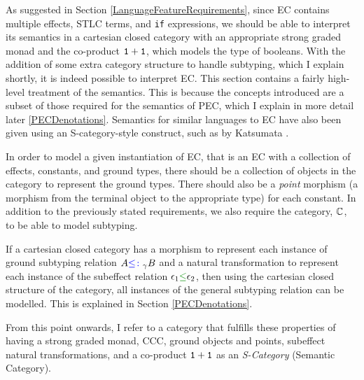 \documentclass{Report}
\begin{document}
As suggested in Section \ref{LanguageFeatureRequirements}, since EC contains multiple effects, STLC terms, and \texttt{if} expressions, we should be able to interpret its semantics in a cartesian closed category with an appropriate strong graded monad and the co-product $\texttt{1} + \texttt{1}$, which models the type of booleans. With the addition of some extra category structure to handle subtyping, which I explain shortly, it is indeed possible to interpret EC. This section contains a fairly high-level treatment of the semantics. This is because the concepts introduced are a subset of those required for the semantics of PEC, which I explain in more detail later \ref{PECDenotations}. Semantics for similar languages to EC have also been given using an S-category-style construct, such as by Katsumata \cite{Katsumata:2014}. 

In order to model a given instantiation of EC, that is an EC with a collection of effects, constants, and ground types, there should be a collection of objects in the category to represent the ground types. There should also be a \textit{point} morphism (a morphism from the terminal object to the appropriate type) for each constant. In addition to the previously stated requirements, we also require the category, $\mathbb{C}$, to be able to model subtyping. 

If a cartesian closed category has a morphism to represent each instance of  ground subtyping relation $A{\color{blue} \leq\colon}_\gamma B$ and a natural transformation to represent each instance of the subeffect relation $\e_1\subeffect \e_2$, then using the cartesian closed structure of the category, all instances of the general subtyping relation can be modelled. This is explained in Section \ref{PECDenotations}.

From this point onwards, I refer to a category that fulfills these properties of having a strong graded monad, CCC, ground objects and points, subeffect natural transformations, and a co-product $\texttt{1} + \texttt{1}$ as an \textit{S-Category} (Semantic Category).
\end{document}
